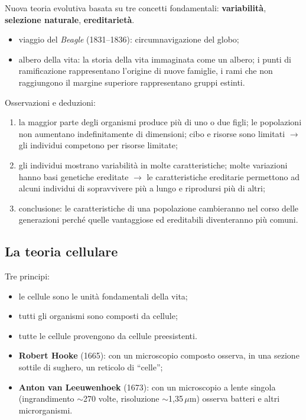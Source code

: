 Nuova teoria evolutiva basata su tre concetti fondamentali: \textbf{variabilità}, \textbf{selezione naturale}, \textbf{ereditarietà}.
\begin{itemize}
  \item viaggio del \textit{Beagle} (1831--1836): circumnavigazione del globo;
  \item albero della vita: la storia della vita immaginata come un albero; i punti di ramificazione rappresentano l'origine di nuove famiglie, i rami che non raggiungono il margine superiore rappresentano gruppi estinti.
\end{itemize}
Osservazioni e deduzioni:
\begin{enumerate}
  \item la maggior parte degli organismi produce più di uno o due figli; le popolazioni non aumentano indefinitamente di dimensioni; cibo e risorse sono limitati $\rightarrow$ gli individui competono per risorse limitate;
  \item gli individui mostrano variabilità in molte caratteristiche; molte variazioni hanno basi genetiche ereditate $\rightarrow$ le caratteristiche ereditarie permettono ad alcuni individui di sopravvivere più a lungo e riprodursi più di altri;
  \item conclusione: le caratteristiche di una popolazione cambieranno nel corso delle generazioni perché quelle vantaggiose ed ereditabili diventeranno più comuni.
\end{enumerate}

\subsection{La teoria cellulare}

Tre principi:
\begin{itemize}
  \item le cellule sono le unità fondamentali della vita;
  \item tutti gli organismi sono composti da cellule;
  \item tutte le cellule provengono da cellule preesistenti.
\end{itemize}

\begin{itemize}
  \item \textbf{Robert Hooke} (1665): con un microscopio composto osserva, in una sezione sottile di sughero, un reticolo di ``celle'';
  \item \textbf{Anton van Leeuwenhoek} (1673): con un microscopio a lente singola (ingrandimento $\sim$270 volte, risoluzione $\sim$1,35\,$\mu$m) osserva batteri e altri microrganismi.
\end{itemize}

